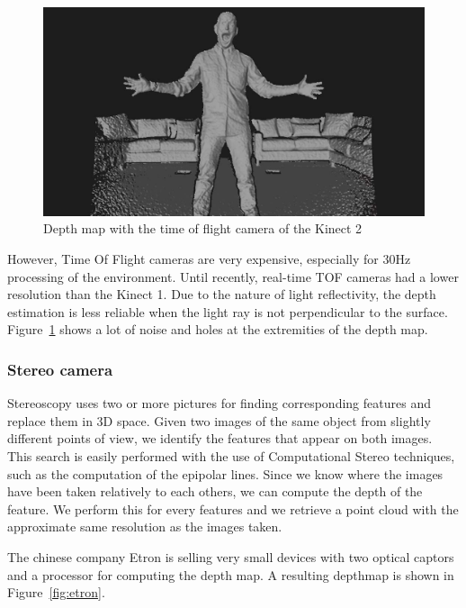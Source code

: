 \documentclass[12pt, twoside]{article}
\begin{document}
\begin{figure}[h]
  \centering
  \includegraphics[scale=0.3]{kinect2depth.jpg}
  \caption{\label{fig:depthK2} Depth map with the time of flight camera of the Kinect 2\protect\footnotemark}
\end{figure}

However, Time Of Flight cameras are very expensive, especially for 30Hz processing of the environment. Until recently, real-time TOF cameras had a lower resolution than the Kinect 1. Due to the nature of light reflectivity, the depth estimation is less reliable when the light ray is not perpendicular to the surface. Figure~\ref{fig:depthK2} shows a lot of noise and holes at the extremities of the depth map.

\subsubsection{Stereo camera}
\label{subsec:stereocam}
Stereoscopy uses two or more pictures for finding corresponding features and replace them in 3D space. Given two images of the same object from slightly different points of view, we identify the features that appear on both images. This search is easily performed with the use of Computational Stereo techniques, such as the computation of the epipolar lines. Since we know where the images have been taken relatively to each others, we can compute the depth of the feature. We perform this for every features and we retrieve a point cloud with the approximate same resolution as the images taken.

The chinese company Etron is selling very small devices with two optical captors and a processor for computing the depth map. A resulting depthmap is shown in Figure~\ref{fig:etron}.
\end{document}
